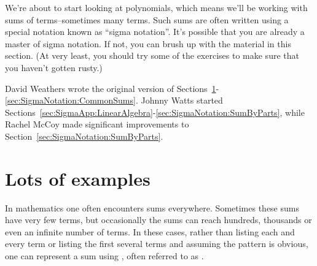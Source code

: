 


We're about to start looking at polynomials, which means we'll be working with sums of terms--sometimes many terms. Such sums are often written using a special notation known as ``sigma notation''.  It's possible that you are already a master of sigma notation. If not, you can brush up with the material in this section. (At very least, you should try some of the exercises to make sure that you haven't gotten rusty.)
\bigskip

David Weathers wrote the original version of Sections~\ref{sec:SigmaNotation:Examples}-\ref{sec:SigmaNotation:CommonSums}. Johnny Watts started Sections~\ref{sec:SigmaApp:LinearAlgebra}-\ref{sec:SigmaNotation:SumByParts}, while  Rachel McCoy made significant improvements to Section~\ref{sec:SigmaNotation:SumByParts}.

\section{Lots of examples\quad
{}}
\label{sec:SigmaNotation:Examples}

In mathematics one often encounters sums everywhere.  Sometimes these sums have very few terms, but occasionally the sums can reach hundreds, thousands or even an infinite number of terms.  In these cases, rather than listing each and every term or listing the first several terms and assuming the pattern is obvious, one can represent a sum using , often referred to as . 

